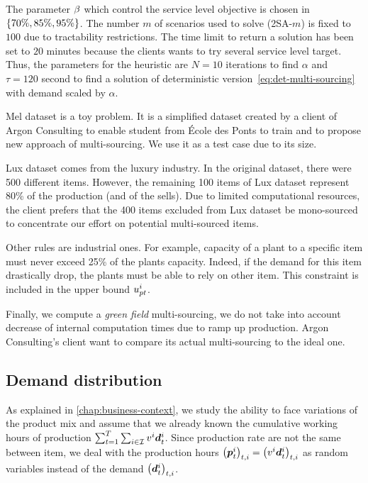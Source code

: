 The parameter $\beta$ which control the service level objective is chosen in $\crbracket{70\%,85\%,95\%}$.
The number $m$ of scenarios used to solve (2SA-$m$) is fixed to $100$ due to tractability restrictions.
The time limit to return a solution has been set to $20$ minutes because the clients wants to try several service level target.
Thus, the parameters for the heuristic are $N=10$ iterations to find $\alpha$ and $\tau=120$ second to find a solution of deterministic version~\eqref{eq:det-multi-sourcing} with demand scaled by $\alpha$.


\medskip


Mel dataset is a toy problem.
It is a simplified dataset created by a client of Argon Consulting to enable student from \'Ecole des Ponts to train and to propose new approach of multi-sourcing.
We use it as a test case due to its size.


\medskip


Lux dataset comes from the luxury industry.
In the original dataset, there were 500 different items.
However, the remaining 100 items of Lux dataset represent 80\% of the production (and of the sells).
Due to limited computational resources, the client prefers that the 400 items excluded from Lux dataset be mono-sourced to concentrate our effort on potential multi-sourced items.


Other rules are industrial ones.
For example, capacity of a plant to a specific item must never exceed 25\% of the plants capacity.
Indeed, if the demand for this item drastically drop, the plants must be able to rely on other item.
This constraint is included in the upper bound $u_{pt}^i$.


Finally, we compute a \emph{green field} multi-sourcing, \ie we do not take into account decrease of internal computation times due to ramp up production.
Argon Consulting's client want to compare its actual multi-sourcing to the ideal one.


\subsection{Demand distribution}
\label{sec:multi-sourcing:numerical-experiments:demand-distribution}



As explained in \cref{chap:business-context}, we study the ability to face variations of the product mix and assume that we already known the cumulative working hours of production $\sum_{t=1}^{\horizon}\sum_{i\in\REF}\rate^i\va\demand_t^i$.
Since production rate are not the same between item, we deal with the production hours $\bracket{\va p_t^i}_{t,i}=\bracket{\rate^i\va\demand_t^i}_{t,i}$ as random variables instead of the demand $\bracket{\va\demand_t^i}_{t,i}$.



